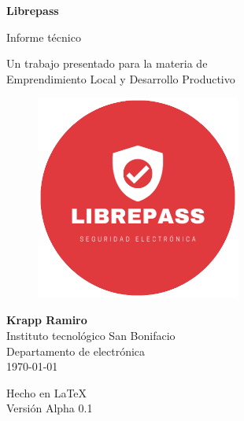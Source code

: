 \documentclass{article}
\begin{document}
\begin{titlepage}
	\begin{center}
		\vspace{1cm}

		{\Huge
			\textbf{Librepass}}

		\vspace{0.3cm}
		{\LARGE
			Informe técnico}

		\vspace{0.5cm}
		{\Large
			Un trabajo presentado para la materia de \\
			Emprendimiento Local y Desarrollo Productivo}

		\vspace{2cm}

		\begin{figure}[H]
			\centering
			\includegraphics[width=0.6\textwidth]{logo.png}
		\end{figure}

		\vfill

		{\Large
			\textbf{Krapp Ramiro} \\
			\vspace{0.5cm}
			Instituto tecnológico San Bonifacio\\
			Departamento de electrónica\\
			\today
		}

		\vspace{0.5cm}
		{\large Hecho en {\LaTeX}\\
			Versión Alpha 0.1}

	\end{center}
\end{titlepage}
\end{document}
